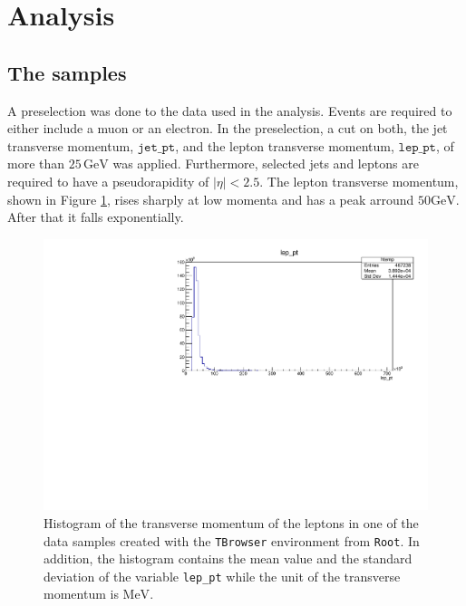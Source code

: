 \section{Analysis}\label{sec:analysis}

\subsection{The samples}
A preselection was done to the data used in the analysis. Events are required to either include a muon or an electron.
In the preselection, a cut on both, the jet transverse momentum, $\texttt{jet\_pt}$, and the lepton transverse momentum, $\texttt{lep\_pt}$,
of more than $25 \, \si{\giga\eV}$ was applied.
Furthermore, selected jets and leptons are required to have a pseudorapidity of $|\eta| <2.5$.
The lepton transverse momentum, shown in Figure \ref{fig:unselected_pt}, rises sharply at low momenta and has a peak arround $50  \si{\giga\eV}$. After that it falls exponentially.

\begin{figure}[tb]
    \centering
    \includegraphics[width=.9\textwidth]{plots/TBrowser_hist.pdf}
    \caption{Histogram of the transverse momentum of the leptons in one of the data samples created with the \texttt{TBrowser} environment from \texttt{Root}.
    In addition, the histogram contains the mean value and the standard deviation of the variable \texttt{lep\_pt} while the unit of the transverse momentum is $\si{\mega\eV}$.}
    \label{fig:unselected_pt}
  \end{figure}

